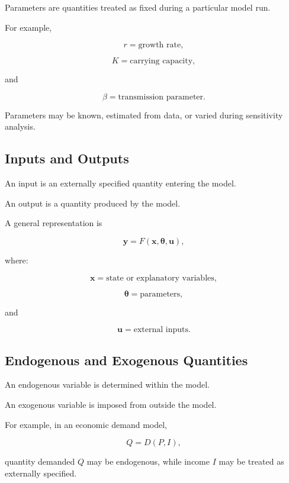 Parameters are quantities treated as fixed during a particular model run.

For example,

\[
\boxed{
r
=
\text{growth rate},
}
\]

\[
\boxed{
K
=
\text{carrying capacity},
}
\]

and

\[
\boxed{
\beta
=
\text{transmission parameter}.
}
\]

Parameters may be known, estimated from data, or varied during sensitivity
analysis.

\subsection{Inputs and Outputs}
\label{subsec:model-input-output}

An input is an externally specified quantity entering the model.

An output is a quantity produced by the model.

A general representation is

\[
\boxed{
\mathbf{y}
=
F(\mathbf{x},\boldsymbol{\theta},\mathbf{u}),
}
\]

where:

\[
\mathbf{x}
=
\text{state or explanatory variables},
\]

\[
\boldsymbol{\theta}
=
\text{parameters},
\]

and

\[
\mathbf{u}
=
\text{external inputs}.
\]

\subsection{Endogenous and Exogenous Quantities}
\label{subsec:endogenous-exogenous}

An endogenous variable is determined within the model.

An exogenous variable is imposed from outside the model.

For example, in an economic demand model,

\[
Q=D(P,I),
\]

quantity demanded \(Q\) may be endogenous, while income \(I\) may be treated
as externally specified.

